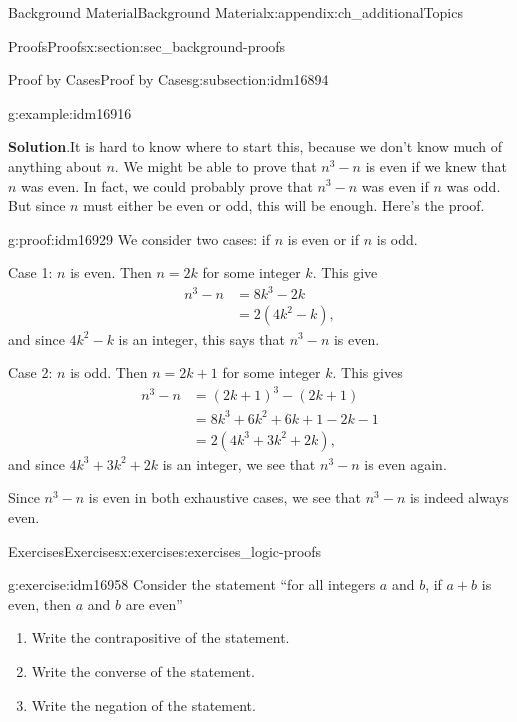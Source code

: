 \documentclass[oneside,10pt,]{book}
\numberwithin{equation}{chapter}
\newcommand{\amp}{&}
\begin{document}
\begin{appendixptx}{Background Material}{}{Background Material}{}{}{x:appendix:ch_additionalTopics}
\begin{sectionptx}{Proofs}{}{Proofs}{}{}{x:section:sec_background-proofs}
\begin{subsectionptx}{Proof by Cases}{}{Proof by Cases}{}{}{g:subsection:idm16894}
\begin{example}{}{g:example:idm16916}
\par\smallskip%
\noindent\textbf{Solution}.\hypertarget{g:solution:idm16921}{}\quad{}It is hard to know where to start this, because we don't know much of anything about \(n\). We might be able to prove that \(n^3 - n\) is even if we knew that \(n\) was even. In fact, we could probably prove that \(n^3-n\) was even if \(n\) was odd. But since \(n\) must either be even or odd, this will be enough. Here's the proof.%
\begin{proofptx}{}{g:proof:idm16929}
We consider two cases: if \(n\) is even or if \(n\) is odd.%
\par
Case 1: \(n\) is even. Then \(n = 2k\) for some integer \(k\). This give%
\begin{align*}
n^3 - n \amp = 8k^3 - 2k\\
\amp = 2(4k^2 - k),
\end{align*}
and since \(4k^2 - k\) is an integer, this says that \(n^3-n\) is even.%
\par
Case 2: \(n\) is odd. Then \(n = 2k+1\) for some integer \(k\). This gives%
\begin{align*}
n^3 - n \amp = (2k+1)^3 - (2k+1)\\
\amp = 8k^3 + 6k^2 + 6k + 1 - 2k - 1\\
\amp = 2(4k^3 + 3k^2 + 2k),
\end{align*}
and since \(4k^3 + 3k^2 + 2k\) is an integer, we see that \(n^3 - n\) is even again.%
\par
Since \(n^3 - n\) is even in both exhaustive cases, we see that \(n^3 - n\) is indeed always even.%
\end{proofptx}
\end{example}
\end{subsectionptx}
%
%
\typeout{************************************************}
\typeout{************************************************}
%
\begin{exercises-subsection}{Exercises}{}{Exercises}{}{}{x:exercises:exercises_logic-proofs}
\begin{divisionexercise}{1}{}{}{g:exercise:idm16958}%
Consider the statement ``for all integers \(a\) and \(b\), if \(a + b\) is even, then \(a\) and \(b\) are even''%
\par
%
\begin{enumerate}[label=(\alph*)]
\item{}Write the contrapositive of the statement.%
\item{}Write the converse of the statement.%
\item{}Write the negation of the statement.%

\end{enumerate}
\end{divisionexercise}
\end{exercises-subsection}
\end{sectionptx}
\end{appendixptx}
\end{document}
